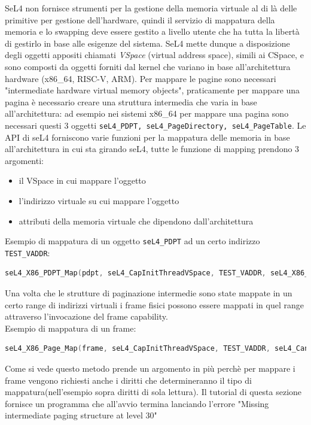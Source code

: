 SeL4 non fornisce strumenti per la gestione della memoria virtuale al di là delle primitive per gestione dell'hardware, quindi il servizio di mappatura della memoria e lo swapping deve essere gestito a livello utente che ha tutta la libertà di gestirlo in base alle esigenze del sistema. SeL4 mette dunque a disposizione degli oggetti appositi chiamati \textit{VSpace} (virtual address space), simili ai CSpace, e sono composti da oggetti forniti dal kernel che variano in base all'architettura hardware (x86\_64, RISC-V, ARM). Per mappare le pagine sono necessari "intermediate hardware virtual memory objects", praticamente per mappare una pagina è necessario creare una struttura intermedia che varia in base all'architettura: ad esempio nei sistemi x86\_64 per mappare una pagina sono necessari questi 3 oggetti \texttt{seL4\_PDPT, seL4\_PageDirectory, seL4\_PageTable}. Le API di seL4 forniscono varie funzioni per la mappatura delle memoria in base all'architettura in cui sta girando seL4, tutte le funzione di mapping prendono 3 argomenti:
\begin{itemize}
	\item il VSpace in cui mappare l'oggetto
	\item l'indirizzo virtuale su cui mappare l'oggetto
	\item attributi della memoria virtuale che dipendono dall'architettura 
\end{itemize}
Esempio di mappatura di un oggetto \texttt{seL4\_PDPT} ad un certo indirizzo \texttt{TEST\_VADDR}:
\begin{lstlisting}[language=C++]
seL4_X86_PDPT_Map(pdpt, seL4_CapInitThreadVSpace, TEST_VADDR, seL4_X86_Default_VMAttributes);
\end{lstlisting}
Una volta che le strutture di paginazione intermedie sono state mappate in un certo range di indirizzi virtuali i frame fisici possono essere mappati in quel range attraverso l'invocazione del frame capability.\\
Esempio di mappatura di un frame:
\begin{lstlisting}[language=C++]
seL4_X86_Page_Map(frame, seL4_CapInitThreadVSpace, TEST_VADDR, seL4_CanRead, seL4_X86_Default_VMAttributes);
\end{lstlisting}
Come si vede questo metodo prende un argomento in più perchè per mappare i frame vengono richiesti anche i diritti che determineranno il tipo di mappatura(nell'esempio sopra diritti di sola lettura).
Il tutorial di questa sezione fornisce un programma che all'avvio termina lanciando l'errore "Missing intermediate paging structure at level 30" 
